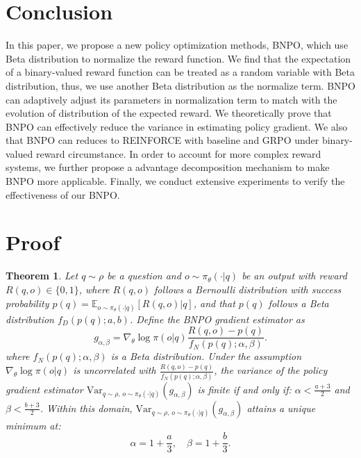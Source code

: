 \documentclass{article}
\theoremstyle{plain}
\newtheorem{theorem}{Theorem}
\theoremstyle{definition}
\theoremstyle{remark}
\begin{document}
\section{Conclusion}
In this paper, we propose a new policy optimization methods, BNPO, which use Beta distribution to normalize the reward function. We find that the expectation of a binary-valued reward function can be treated as a random variable with Beta distribution, thus, we use another Beta distribution as the normalize term. BNPO can adaptively adjust its parameters in normalization term to match with the evolution of distribution of the expected reward. We theoretically prove that BNPO can effectively reduce the variance in estimating policy gradient. We also that BNPO can reduces to REINFORCE with baseline and GRPO under binary-valued reward circumstance. In order to account for more complex reward systems, we further propose a advantage decomposition mechanism to make BNPO more applicable. Finally, we conduct extensive experiments to verify the effectiveness of our BNPO.











\newpage


\appendix

\appendix
\setcounter{theorem}{0}


\section{Proof}
\label{appendix:1}

\begin{theorem}
Let \( q \sim \rho \) be a question and \( o \sim \pi_\theta(\cdot | q) \) be an output with reward \( R(q, o) \in \{0, 1\} \), where $R(q,o)$ follows a Bernoulli distribution with success probability \( p(q) = \mathbb{E}_{o\sim\pi_\theta(\cdot| q)}[R(q, o) | q] \), and that $p(q)$ follows a Beta distribution $f_{D}(p(q);a,b) $. Define the BNPO gradient estimator as
\[
g_{\alpha,\beta} = \nabla_\theta \log \pi(o | q) \frac{R(q,o)-p(q)}{f_{N}(p(q);\alpha,\beta)}.
\]
where $f_{N}(p(q);\alpha,\beta)$ is a Beta distribution. Under the assumption $\nabla_\theta \log \pi(o | q)$ is uncorrelated with $\frac{R(q,o)-p(q)}{f_{N}(p(q);\alpha,\beta)}$, the variance of the policy gradient estimator $\mathrm{Var}_{q\sim\rho,\, o\sim\pi_\theta(\cdot| q)}(g_{\alpha,\beta})$ is finite if and only if: \( \alpha < \frac{a + 3}{2} \) and \( \beta < \frac{b + 3}{2} \). Within this domain, $\mathrm{Var}_{q\sim\rho,\, o\sim\pi_\theta(\cdot| q)}(g_{\alpha,\beta})$ attains a unique minimum at:
\[
\alpha = 1 + \frac{a}{3}, \quad \beta = 1 + \frac{b}{3}.
\]
\end{theorem}
\end{document}
